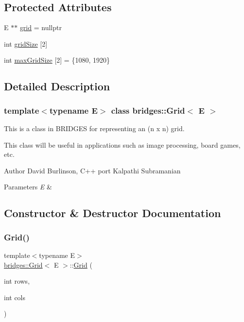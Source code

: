 \subsection*{Protected Attributes}
\begin{DoxyCompactItemize}
\item 
E $\ast$$\ast$ \mbox{\hyperlink{classbridges_1_1_grid_aea6c38498d477f09dc03906ee6fb6e19}{grid}} = nullptr
\item 
int \mbox{\hyperlink{classbridges_1_1_grid_af7c3a077b54e3346621e54276c1fa13e}{grid\+Size}} \mbox{[}2\mbox{]}
\item 
int \mbox{\hyperlink{classbridges_1_1_grid_a800909a94e0affac82da79cf3e6d03e5}{max\+Grid\+Size}} \mbox{[}2\mbox{]} = \{1080, 1920\}
\end{DoxyCompactItemize}


\subsection{Detailed Description}
\subsubsection*{template$<$typename E$>$\newline
class bridges\+::\+Grid$<$ E $>$}

This is a class in B\+R\+I\+D\+G\+ES for representing an (n x n) grid. 

This class will be useful in applications such as image processing, board games, etc.

\begin{DoxyAuthor}{Author}
David Burlinson, C++ port Kalpathi Subramanian
\end{DoxyAuthor}

\begin{DoxyParams}{Parameters}
{\em E} & \\
\hline
\end{DoxyParams}


\subsection{Constructor \& Destructor Documentation}
\mbox{\label{classbridges_1_1_grid_af8bb9244c4c713f2325af6d4754ad1e9}} 
\subsubsection{\texorpdfstring{Grid()}{Grid()}\hspace{0.1cm}{\footnotesize\ttfamily [1/4]}}
{\footnotesize\ttfamily template$<$typename E$>$ \\
\mbox{\hyperlink{classbridges_1_1_grid}{bridges\+::\+Grid}}$<$ E $>$\+::\mbox{\hyperlink{classbridges_1_1_grid}{Grid}} (\begin{DoxyParamCaption}\item[{int}]{rows,  }\item[{int}]{cols }\end{DoxyParamCaption})\hspace{0.3cm}{\ttfamily [inline]}}

